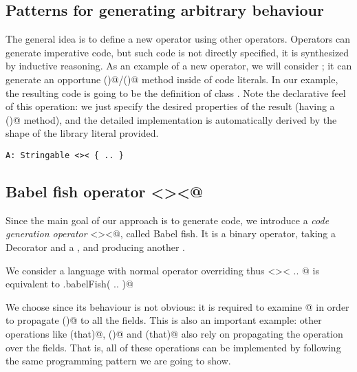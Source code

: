 







\subsection*{Patterns for generating arbitrary behaviour}
The general idea is to define a new operator
using other operators.
Operators can generate imperative code, but such code is not directly
specified, it is synthesized by inductive reasoning.
As an example of a new operator, we will
consider \Q@Stringable@;
it can generate an opportune \Q@toS()@/\Q@toString()@ method inside of code literals.
In our example, the resulting code is going to be the definition
of class \Q@A@.
Note the declarative feel of this operation: we just specify the desired properties of the result (having a \Q@toS()@ method), and the detailed implementation is  
 automatically derived by the shape of the library literal provided.

\begin{lstlisting}
A: Stringable <>< { .. }
\end{lstlisting}

\subsection*{Babel fish operator \Q@<><@}
Since the main goal of our approach is to generate code, we introduce a \emph{code generation operator} \Q@<><@, called Babel fish.
It is a binary operator, taking a Decorator and a \Q@Library@, and producing another \Q@Library@.

We consider a language with normal operator overriding thus \Q@Stringable <>< { .. }@ is equivalent to \Q@Stringable.babelFish({ .. })@ 


We choose \Q@Stringable@ since its behaviour is not obvious: it is required to examine @ in order to 
propagate \Q@toS()@ to all the fields.
This is also an important example: other operations like \Q@equals(that)@, \Q@hashCode()@ and \Q@compare(that)@
also rely on propagating the operation over the fields.
That is, all of these operations can be implemented by
following the same programming pattern we are going to show.

